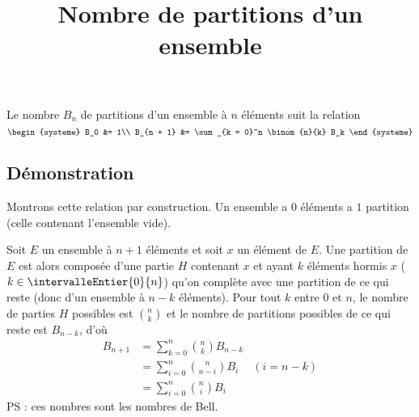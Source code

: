 \documentclass[fontsize=12pt,twoside=false,parskip=half, french]{scrartcl}
\title{Nombre de partitions d’un ensemble}
\date{}
\author{}
\begin{document}
\maketitle
   \begin{Theoreme}
      Le nombre $B_n$ de partitions d’un ensemble à $n$ éléments suit la relation
      \[
         \begin{systeme}
            B_0       &= 1\\
            B_{n + 1} &= \sum_{k = 0}^n \binom{n}{k} B_k
         \end{systeme}
      \]
   \end{Theoreme}
   \subsection{Démonstration}
      Montrons cette relation par construction. Un ensemble a $0$ éléments a $1$ partition
      (celle contenant l’ensemble vide).

      Soit $E$ un ensemble à $n + 1$ éléments et soit $x$ un élément de $E$.
      Une partition de $E$ est alors composée d’une partie $H$
      contenant $x$ et ayant $k$ éléments hormis $x$ ($k \in \intervalleEntier{0}{n}$) qu’on complète avec une partition de ce qui reste (donc d’un ensemble à $n - k$ 
      éléments). Pour tout $k$ entre $0$ et $n$, le nombre de parties $H$ possibles
      est $\binom{n}{k}$ et le nombre de partitions possibles de ce qui reste est 
      $B_{n - k}$, d’où
      \begin{align*}
         B_{n + 1} &= \sum_{k = 0}^n \binom{n}{k} B_{n - k}\\
                   &= \sum_{i = 0}^n \binom{n}{n - i} B_i & (i = n - k)\\
                   &=  \sum_{i = 0}^n \binom{n}{i} B_i
      \end{align*}
      PS : ces nombres sont les nombres de Bell.      
\end{document}
